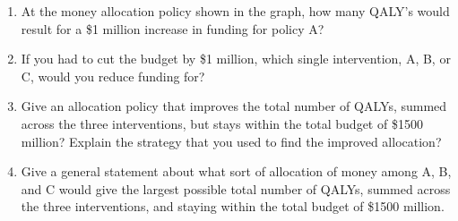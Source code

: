 \newpage
\begin{enumerate}

\item At the money allocation policy shown in the graph, how many QALY's would
result for a \$1 million increase in funding for policy A?

\answerSpace{1in}


\item If you had to cut the budget by \$1 million, which single intervention, A,
  B, or C,  would you reduce funding for?

\answerSpace{1in}

\item Give an allocation policy that improves the total number of QALYs, summed
across the three interventions, but stays within the total budget of
\$1500 million?  Explain the strategy that you used to find
the improved allocation?

\answerSpace{1.3in}

\item Give a general statement about what sort of allocation of money
  among A, B, and C would give the largest possible total number of
  QALYs, summed across the three interventions, and staying within the
  total budget of \$1500 million.

\answerSpace{1.3in}

\end{enumerate}
